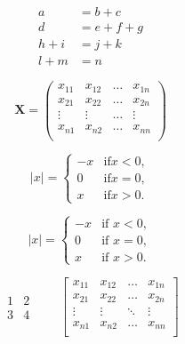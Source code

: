\documentclass[12pt]{ctexrep}
\begin{document}
\begin{equation}
\begin{aligned}
a &= b + c \\
d &= e + f +g \\
h + i &= j + k \\
l + m &= n
\end{aligned}
\end{equation}


\[
\mathbf{X} = \left( 
\begin{array}{cccc}
x_{11} & x_{12} & \ldots & x_{1n}\\
x_{21} & x_{22} & \ldots & x_{2n}\\
\vdots & \vdots  & \ldots & \vdots\\
x_{n1} & x_{n2} & \ldots & x_{nn}\\  
\end{array}  \right)
\]

\[
|x| = \left\{ 
\begin{array}{rl}
-x & \text{if} x<0,\\
0  & \text{if} x=0,\\
x  & \text{if} x>0.
\end{array} \right.
\]

\[
|x| = 
\begin{cases}
-x & \text{if } x<0,\\
0 & \text{if } x=0,\\
x & \text{if } x>0.
\end{cases}  
\]


\[
\begin{matrix}
1 & 2 \\ 3 & 4
\end{matrix}  \qquad
\begin{bmatrix}
x_{11} & x_{12} & \ldots & x_{1n}\\
x_{21} & x_{22} & \ldots & x_{2n}\\
\vdots & \vdots & \ddots & \vdots\\
x_{n1} & x_{n2} & \ldots & x_{nn}\\
\end{bmatrix}
\]
\end{document}
